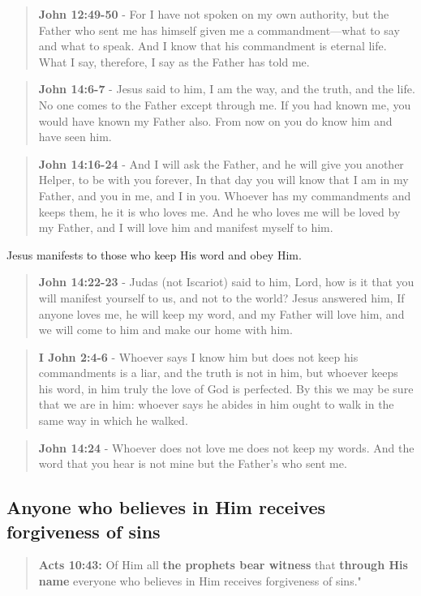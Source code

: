 \documentclass[11pt]{article}
\begin{document}
\begin{quote}
\textbf{John 12:49-50} - For I have not spoken on my own authority, but the Father who sent me has himself given me a commandment—what to say and what to speak. And I know that his commandment is eternal life. What I say, therefore, I say as the Father has told me.
\end{quote}

\begin{quote}
\textbf{John 14:6-7} - Jesus said to him, I am the way, and the truth, and the life. No one comes to the Father except through me. If you had known me, you would have known my Father also. From now on you do know him and have seen him.
\end{quote}

\begin{quote}
\textbf{John 14:16-24} - And I will ask the Father, and he will give you another Helper, to be with you forever, In that day you will know that I am in my Father, and you in me, and I in you. Whoever has my commandments and keeps them, he it is who loves me. And he who loves me will be loved by my Father, and I will love him and manifest myself to him.
\end{quote}

Jesus manifests to those who keep His word and obey Him.

\begin{quote}
\textbf{John 14:22-23} - Judas (not Iscariot) said to him, Lord, how is it that you will manifest yourself to us, and not to the world? Jesus answered him, If anyone loves me, he will keep my word, and my Father will love him, and we will come to him and make our home with him.
\end{quote}

\begin{quote}
\textbf{I John 2:4-6} - Whoever says I know him but does not keep his commandments is a liar, and the truth is not in him, but whoever keeps his word, in him truly the love of God is perfected. By this we may be sure that we are in him: whoever says he abides in him ought to walk in the same way in which he walked.
\end{quote}

\begin{quote}
\textbf{John 14:24} - Whoever does not love me does not keep my words. And the word that you hear is not mine but the Father's who sent me.
\end{quote}

\subsection{Anyone who believes in Him receives forgiveness of sins}
\label{sec:orgb8f3251}
\begin{quote}
\textbf{Acts 10:43:} Of Him all \textbf{the prophets bear witness} that \textbf{through His name} everyone who believes in Him receives forgiveness of sins."
\end{quote}
\end{document}
